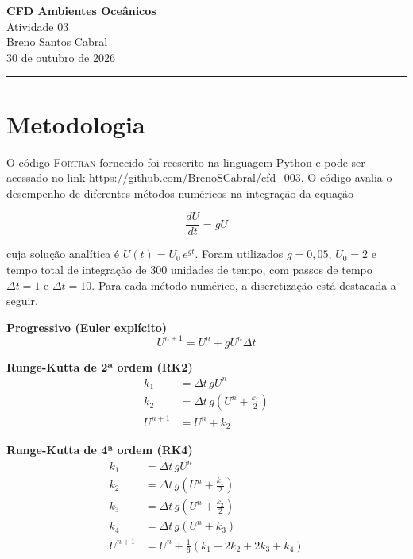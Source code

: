 \documentclass[11pt,a4paper]{article}
\begin{document}
\thispagestyle{empty}
\begin{center}
  {\Large\bfseries\color{destaque} CFD Ambientes Oceânicos}\\[0.3em]
  {\large Atividade 03}\\[0.8em]
  {\normalsize Breno Santos Cabral}\\[0.2em]
  {\small 30 de outubro de 2026}
\end{center}
\noindent\textcolor{destaque}{\rule{\textwidth}{0.8pt}}

\section{Metodologia}

O código \textsc{Fortran} fornecido foi reescrito na linguagem Python e pode ser acessado no link \url{https://github.com/BrenoSCabral/cfd_003}. O código avalia o desempenho de diferentes métodos numéricos na integração da equação

\begin{equation}
\frac{dU}{dt} = gU
\label{eq:cresc}
\end{equation}

\noindent cuja solução analítica é $U(t) = U_0\, e^{gt}$. Foram utilizados $g = 0{,}05$, $U_0 = 2$ e tempo total de integração de 300 unidades de tempo, com passos de tempo $\Delta t = 1$ e $\Delta t = 10$. Para cada método numérico, a discretização está destacada a seguir.

\textbf{Progressivo (Euler explícito)}
\begin{equation}
U^{n+1} = U^{n} + g U^{n} \Delta t
\end{equation}

\textbf{Runge-Kutta de 2ª ordem (RK2)}
\begin{equation}
\begin{aligned}
k_1 &= \Delta t \, g U^{n} \\
k_2 &= \Delta t \, g \left( U^{n} + \frac{k_1}{2} \right) \\
U^{n+1} &= U^{n} + k_2
\end{aligned}
\end{equation}

\textbf{Runge-Kutta de 4ª ordem (RK4)}
\begin{equation}
\begin{aligned}
k_1 &= \Delta t \, g U^{n} \\
k_2 &= \Delta t \, g \left( U^{n} + \frac{k_1}{2} \right) \\
k_3 &= \Delta t \, g \left( U^{n} + \frac{k_2}{2} \right) \\
k_4 &= \Delta t \, g \left( U^{n} + k_3 \right) \\
U^{n+1} &= U^{n} + \frac{1}{6}\left( k_1 + 2k_2 + 2k_3 + k_4 \right)
\end{aligned}
\end{equation}
\end{document}
